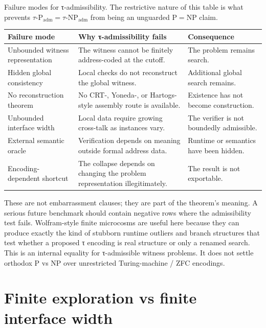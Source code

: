 \documentclass{pantarhei-researchnote}
\newcommand{\Padm}{\ensuremath{\tau\text{-}\mathrm{P}_{\mathrm{adm}}}}
\newcommand{\NPadm}{\ensuremath{\tau\text{-}\mathrm{NP}_{\mathrm{adm}}}}
\newcommand{\ClassP}{\ensuremath{\mathrm{P}}}
\newcommand{\ClassNP}{\ensuremath{\mathrm{NP}}}
\begin{document}
\begin{widetable}[t]
\caption{Failure modes for τ-admissibility. The restrictive nature of
this table is what prevents \(\Padm=\NPadm\) from being an unguarded
\(\ClassP=\ClassNP\) claim.}
\label{tab:admissibility-failures}
\prtablefont
\begin{tabularx}{\textwidth}{p{}Y Y}
\toprule
\textbf{Failure mode} & \textbf{Why τ-admissibility fails} & \textbf{Consequence} \\
\midrule
Unbounded witness representation & The witness cannot be finitely
address-coded at the cutoff. & The problem remains search. \\
Hidden global consistency & Local checks do not reconstruct the global
witness. & Additional global search remains. \\
No reconstruction theorem & No CRT-, Yoneda-, or Hartogs-style assembly
route is available. & Existence has not become construction. \\
Unbounded interface width & Local data require growing cross-talk as
instances vary. & The verifier is not boundedly admissible. \\
External semantic oracle & Verification depends on meaning outside formal
address data. & Runtime or semantics have been hidden. \\
Encoding-dependent shortcut & The collapse depends on changing the
problem representation illegitimately. & The result is not exportable. \\
\bottomrule
\end{tabularx}
\end{widetable}

These are not embarrassment clauses; they are part of the theorem's
meaning. A serious future benchmark should contain negative rows where
the admissibility test fails. Wolfram-style finite microcosms are useful
here because they can produce exactly the kind of stubborn runtime
outliers and branch structures that test whether a proposed τ encoding is
real structure or only a renamed search.
This is an internal equality for τ-admissible witness problems. It does
not settle orthodox P vs NP over unrestricted Turing-machine / ZFC
encodings.

\section{Finite exploration vs finite interface width}
\label{sec:finite-interface}
\end{document}
